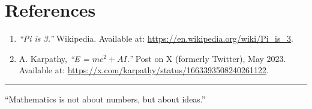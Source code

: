 \documentclass[12pt]{article}
\begin{document}
\section*{References}

\begin{enumerate}
    \item \textit{“Pi is 3.”} Wikipedia. Available at: 
    \href{https://en.wikipedia.org/wiki/Pi_is_3}{https://en.wikipedia.org/wiki/Pi\_is\_3}.
    
    \item A. Karpathy, \textit{“E = $mc^2 + AI$.”} Post on X (formerly Twitter), May 2023. Available at: 
    \href{https://x.com/karpathy/status/1663393508240261122}{https://x.com/karpathy/status/1663393508240261122}.
\end{enumerate}

\vspace{2em}
\hrule

\begin{center}
\small
``Mathematics is not about numbers, but about ideas.''
\end{center}
\end{document}
